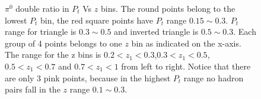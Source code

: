  \begin{figure}[H]
  \centering     
\caption{$\pi^0$ double ratio in $P_t$ Vs $z$ bins. The round points belong to the lowest $P_t$ bin, the red square points have $P_t$ range $0.15\sim 0.3$. $P_t$ range for triangle is $0.3\sim 0.5$ and inverted triangle is $0.5\sim0.3$. Each group of 4 points belongs to one $z$ bin as indicated on the x-axis. The range for the z bins is $0.2<z_1<0.3$,$0.3<z_1<0.5$, $0.5<z_1<0.7$ and $0.7<z_1<1$ from left to right. Notice that there are only 3 pink points, because in the highest $P_t$ range no hadron pairs fall in the $z$ range $0.1\sim 0.3$.}
  \label{fig:ptzresult}
\end{figure}
